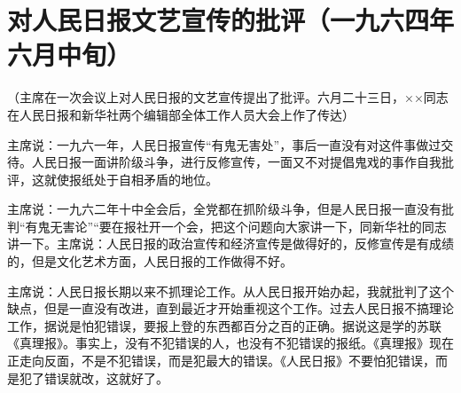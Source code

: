 \section[对人民日报文艺宣传的批评（一九六四年六月中旬）]{对人民日报文艺宣传的批评（一九六四年六月中旬）}


（主席在一次会议上对人民日报的文艺宣传提出了批评。六月二十三日，××同志在人民日报和新华社两个编辑部全体工作人员大会上作了传达）

主席说：一九六一年，人民日报宣传“有鬼无害处”，事后一直没有对这件事做过交待。人民日报一面讲阶级斗争，进行反修宣传，一面又不对提倡鬼戏的事作自我批评，这就使报纸处于自相矛盾的地位。

主席说：一九六二年十中全会后，全党都在抓阶级斗争，但是人民日报一直没有批判“有鬼无害论”“要在报社开一个会，把这个问题向大家讲一下，同新华社的同志讲一下。主席说：人民日报的政治宣传和经济宣传是做得好的，反修宣传是有成绩的，但是文化艺术方面，人民日报的工作做得不好。

主席说：人民日报长期以来不抓理论工作。从人民日报开始办起，我就批判了这个缺点，但是一直没有改进，直到最近才开始重视这个工作。过去人民日报不搞理论工作，据说是怕犯错误，要报上登的东西都百分之百的正确。据说这是学的苏联《真理报》。事实上，没有不犯错误的人，也没有不犯错误的报纸。《真理报》现在正走向反面，不是不犯错误，而是犯最大的错误。《人民日报》不要怕犯错误，而是犯了错误就改，这就好了。

